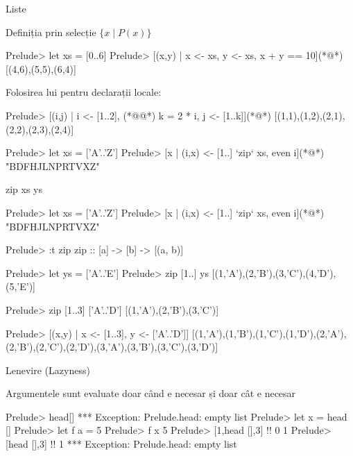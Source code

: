 \documentclass[xcolor=pdftex,romanian,colorlinks]{beamer}
\begin{document}
\begin{section}{Liste}
\begin{frame}[fragile]{Definiția prin selecție $\{x\mid P(x)\}$}
\begin{asciihs}
Prelude> let xs = [0..6]
Prelude> [(x,y) | x <- xs, y <- xs,  x + y == 10](*@\pause@*)
[(4,6),(5,5),(6,4)]
\end{asciihs}
Folosirea lui  pentru declarații locale:
\begin{asciihs}
Prelude> [(i,j) | i <- [1..2], (*@\color{blue}{let}@*) k = 2 * i, j <- [1..k]](*@\pause@*)
[(1,1),(1,2),(2,1),(2,2),(2,3),(2,4)]

Prelude> let xs = ['A'..'Z']
Prelude> [x | (i,x) <- [1..] `zip` xs, even i](*@\pause@*)
"BDFHJLNPRTVXZ"
\end{asciihs}

\end{frame}


\begin{frame}[fragile]{zip xs ys}
\begin{asciihs}
Prelude> let xs = ['A'..'Z']
Prelude> [x | (i,x) <- [1..] `zip` xs, even i](*@\pause@*)
"BDFHJLNPRTVXZ"

Prelude> :t zip
zip :: [a] -> [b] -> [(a, b)]

Prelude> let ys = ['A'..'E']
Prelude> zip [1..]  ys
[(1,'A'),(2,'B'),(3,'C'),(4,'D'),(5,'E')]
\end{asciihs}

\medskip\pause


\begin{asciihs}
Prelude> zip [1..3] ['A'..'D']
[(1,'A'),(2,'B'),(3,'C')]

Prelude> [(x,y) | x <- [1..3], y <- ['A'..'D']]
[(1,'A'),(1,'B'),(1,'C'),(1,'D'),(2,'A'),(2,'B'),(2,'C'),(2,'D'),(3,'A'),(3,'B'),(3,'C'),(3,'D')]
\end{asciihs}

\end{frame}

\begin{frame}[fragile]{Lenevire (Lazyness)}

 Argumentele sunt evaluate doar când e necesar și doar cât e necesar


\begin{asciihs}
Prelude> head[]
*** Exception: Prelude.head: empty list
Prelude> let x = head []
Prelude> let f a = 5
Prelude> f x
5
Prelude> [1,head [],3] !! 0
1
Prelude> [head [],3] !! 1
*** Exception: Prelude.head: empty list
\end{asciihs}

\end{frame}


\end{section}
\end{document}
